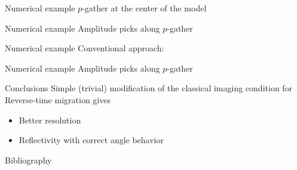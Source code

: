 \documentclass[xcolor=dvipsnames]{beamer}
\begin{document}
\begin{frame}{Numerical example}
$p$-gather at the center of the model
\begin{figure}
\end{figure}
\end{frame}
\begin{frame}{Numerical example}
Amplitude picks along $p$-gather
\begin{figure}
\end{figure}
\end{frame}
\begin{frame}{Numerical example}
Conventional approach:
\begin{figure}
\end{figure}
\end{frame}
\begin{frame}{Numerical example}
Amplitude picks along $p$-gather
\begin{figure}
\end{figure}
\end{frame}
\begin{frame}{Conclusions}
Simple (trivial) modification of the classical
imaging condition for Reverse-time migration gives
\begin{itemize}
  \item Better resolution
  \item Reflectivity with correct angle behavior
\end{itemize}
\end{frame}
\begin{frame}{Bibliography}


\end{frame}
\end{document}
